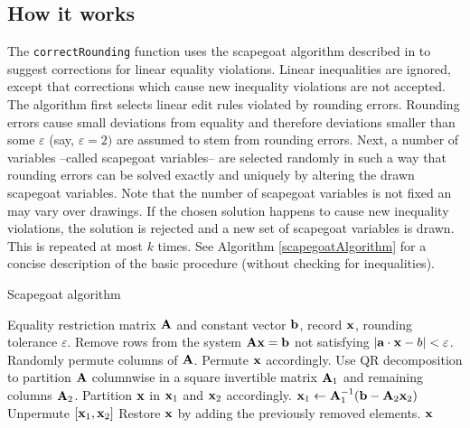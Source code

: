 \documentclass[11pt, fleqn, a4paper]{article}
\begin{document}
\subsection{How it works}
The {\tt correctRounding} function uses the scapegoat algorithm described in
\cite{scholtus:2008} to suggest corrections for linear equality violations.
Linear inequalities are ignored, except that corrections which cause new
inequality violations are not accepted.  The algorithm first selects linear edit
rules violated by rounding errors. Rounding errors cause small deviations from
equality and therefore deviations smaller than some $\varepsilon$ (say,
$\varepsilon=2)$ are assumed to stem from rounding errors.  Next, a number of
variables --called scapegoat variables-- are selected randomly in such a way
that rounding errors can be solved exactly and uniquely by altering the drawn
scapegoat variables. Note that the number of scapegoat variables is not fixed
an may vary over drawings. If the chosen solution happens to cause new
inequality violations, the solution is rejected and a new set of scapegoat
variables is drawn. This is repeated at most $k$ times.  See Algorithm
\ref{scapegoatAlgorithm} for a concise description of the basic procedure
(without checking for inequalities).
%
%
\begin{algorithm}[t]
\caption{Scapegoat algorithm}
\label{scapegoatAlgorithm}
\begin{algorithmic}[1]
\Require Equality restriction matrix $\bf A$ and constant vector $\bf b$, record $\bf x$,
    rounding tolerance $\varepsilon$. 
\State Remove rows from the system  $\bf Ax=b$ not satisfying $|{\bf a}\cdot{\bf x}-b|<\varepsilon$. 
\State Randomly permute columns of $\bf A$. Permute $\bf x$ accordingly.
\State Use QR decomposition to partition $\bf A$ columnwise in a square invertible
    matrix ${\bf A}_1$ and remaining columns ${\bf A}_2$.  Partition $\bf x$ in ${\bf x}_1$ and ${\bf x}_2$ accordingly.
\State ${\bf x}_1\leftarrow {\bf A}_1^{-1}({\bf b}-{\bf A}_2{\bf x}_2)$
\State Unpermute $[{\bf x}_1,{\bf x}_2]$
\EndIf
\State Restore $\bf x$ by adding the previously removed elements.
\Ensure ${\bf x}$
\end{algorithmic}
\end{algorithm}
%
%

%
%
\end{document}
